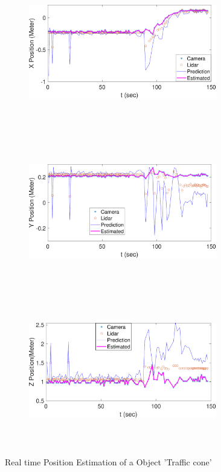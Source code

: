 \begin{figure}
    \centering
    \begin{subfigure}
        \centering
        \includegraphics[height=6.5cm,width=0.9\textwidth]{Images/X_postc.pdf}
    \end{subfigure}
    \begin{subfigure}
        \centering
        \includegraphics[height=6.5cm,width=0.9\textwidth]{Images/Y_postc.pdf}
    \end{subfigure}
    \begin{subfigure}
        \centering
        \includegraphics[height=6.5cm,width=0.9\textwidth]{Images/Z_postc.pdf}
    \end{subfigure}
    \caption{Real time Position Estimation of a Object 'Traffic cone'}
    \label{Stateesttc}
\end{figure}

